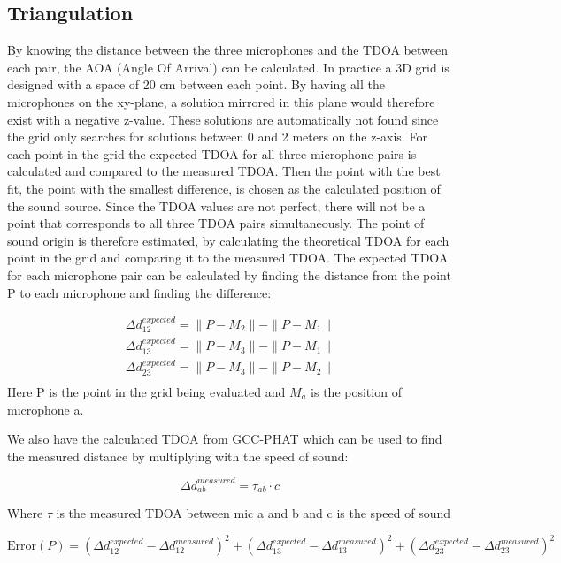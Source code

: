 \subsection{Triangulation}
By knowing the distance between the three microphones and the TDOA between each pair, the AOA (Angle Of Arrival) can be calculated. In practice a 3D grid is designed with a space of 20 cm between each point. By having all the microphones on the xy-plane, a solution mirrored in this plane would therefore exist with a negative z-value. These solutions are automatically not found since the grid only searches for solutions between 0 and 2 meters on the z-axis. For each point in the grid the expected TDOA for all three microphone pairs is calculated and compared to the measured TDOA. Then the point with the best fit, the point with the smallest difference, is chosen as the calculated position of the sound source. Since the TDOA values are not perfect, there will not be a point that corresponds to all three TDOA pairs simultaneously. The point of sound origin is therefore estimated, by calculating the theoretical TDOA for each point in the grid and comparing it to the measured TDOA. The expected TDOA for each microphone pair can be calculated by finding the distance from the point P to each microphone and finding the difference:

\begin{equation}
\begin{align}
\Delta d^{expected}_{12} = \|P - M_2\| - \|P - M_1\| \\
\Delta d^{expected}_{13} = \|P - M_3\| - \|P - M_1\| \\
\Delta d^{expected}_{23} = \|P - M_3\| - \|P - M_2\| \\
\end{align}
\end{equation}
Here P is the point in the grid being evaluated and $M_a$ is the position of microphone a.

We also have the calculated TDOA from GCC-PHAT which can be used to find the measured distance by multiplying with the speed of sound:

\begin{equation}
\Delta d^{measured}_{ab} = \tau_{ab} \cdot c 
\end{equation}

Where $\tau$ is the measured TDOA between mic a and b and c is the speed of sound

\begin{equation}
\text{Error}(P) = (\Delta d^{expected}_{12} - \Delta d^{measured}_{12})^2 + (\Delta d^{expected}_{13} - \Delta d^{measured}_{13})^2 + (\Delta d^{expected}_{23} - \Delta d^{measured}_{23})^2
\end{equation}

